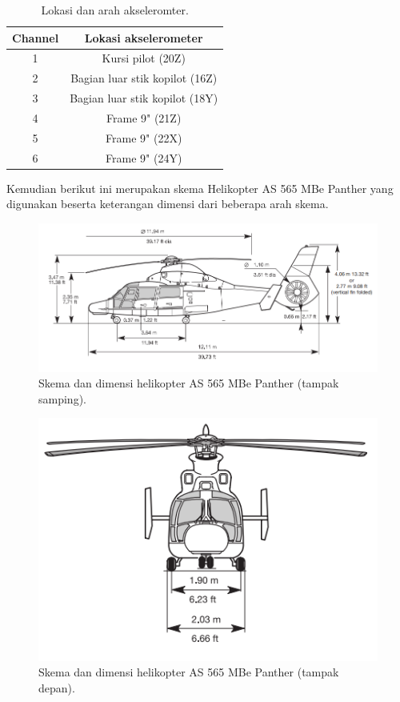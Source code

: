 \begin{longtable}{|c|c|}
	\caption{Lokasi dan arah akseleromter.}
	\label{tb:lokasiakselero}                        	\\
	\hline
	\textbf{Channel} & \textbf{Lokasi akselerometer} 	\\
	\hline
	1            	 & Kursi pilot (20Z)             	\\
	\hline
	2			     & Bagian luar stik kopilot (16Z)   \\
	\hline
	3				 & Bagian luar stik kopilot	(18Y)   \\
	\hline
	4				 & Frame 9" (21Z)                   \\
	\hline
	5				 & Frame 9" (22X)					\\
	\hline
	6				 & Frame 9" (24Y)					\\
	\hline
\end{longtable}

Kemudian berikut ini merupakan skema Helikopter AS 565 MBe Panther yang digunakan beserta keterangan dimensi dari beberapa arah skema.

\begin{figure}[H]
	\centering
	\includegraphics[width=0.8\linewidth]{gambar/tampak_samping.png}
	\caption{Skema dan dimensi helikopter AS 565 MBe Panther (tampak samping).}
	\label{tampak_samping.png}
\end{figure}

\begin{figure}[H]
	\centering
	\includegraphics[width=0.6\linewidth]{gambar/tampak_depan.png}
	\caption{Skema dan dimensi helikopter AS 565 MBe Panther (tampak depan).}
	\label{tampak_depan.png}
\end{figure}

